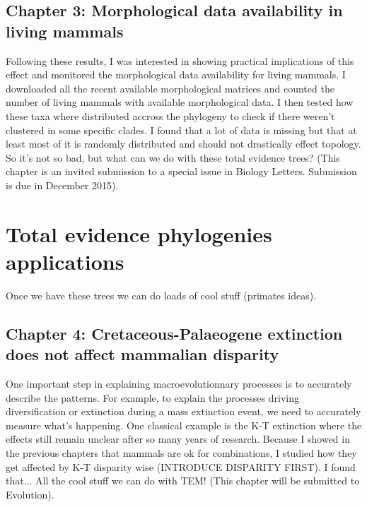 \subsection{Chapter 3: Morphological data availability in living mammals}
Following these results, I was interested in showing practical implications of this effect and monitored the morphological data availability for living mammals.
I downloaded all the recent available morphological matrices and counted the number of living mammals with available morphological data.
I then tested how these taxa where distributed accross the phylogeny to check if there weren't clustered in some specific clades.
I found that a lot of data is missing but that at least most of it is randomly distributed and should not drastically effect topology.
So it's not so bad, but what can we do with these total evidence trees?
(This chapter is an invited submission to a special issue in Biology Letters. Submission is due in December 2015).

\section{Total evidence phylogenies applications}

Once we have these trees we can do loads of cool stuff (primates ideas).

\subsection{Chapter 4: Cretaceous-Palaeogene extinction does not affect mammalian disparity}


One important step in explaining macroevolutionnary processes is to accurately describe the patterns.
For example, to explain the processes driving diversification or extinction during a mass extinction event, we need to accurately measure what's happening.
One classical example is the K-T extinction where the effects still remain unclear after so many years of research.
Because I showed in the previous chapters that mammals are ok for combinations, I studied how they get affected by K-T disparity wise (INTRODUCE DISPARITY FIRST).
I found that...
All the cool stuff we can do with TEM!
(This chapter will be submitted to Evolution).

